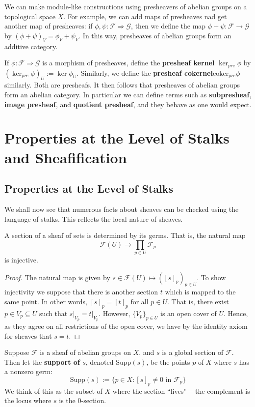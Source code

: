 We can make module-like constructions using presheavers of abelian groups on a topological space $X$. For example, we can add maps of presheaves nad get another map of presheaves: if $\phi,\psi:\mathscr{F}\Rightarrow \mathscr{G}$, then we define the map $\phi+\psi:\mathscr{F}\rightarrow \mathscr{G}$ by $(\phi+\psi)_V = \phi_V+\psi_V$. In this way, presheaves of abelian groups form an additive category.

If $\phi:\mathscr{F}\Rightarrow \mathscr{G}$ is a morphism of presheaves, define the \textbf{presheaf kernel} $\ker_{pre}\phi$ by $(\ker_{pre}\phi)_U := \ker \phi_U$. Similarly, we define the \textbf{presheaf cokernel}$ \text{coker}_{pre}\phi$ similarly. Both are presheafs. It then follows that presheaves of abelian groups form an abelian category. In particular we can define terms such as \textbf{subpresheaf}, \textbf{image presheaf}, and \textbf{quotient presheaf}, and they behave as one would expect.

\section{Properties at the Level of Stalks and Sheafification}

\subsection{Properties at the Level of Stalks}

We shall now see that numerous facts about sheaves can be checked using the language of stalks. This reflects the local nature of sheaves. 

\begin{claim}
    A section of a sheaf of sets is determined by its germs. That is, the natural map $$\mathscr{F}(U)\rightarrow \prod_{p \in U}\mathscr{F}_p$$ is injective.
\end{claim}
\begin{proof}
    The natural map is given by $s \in \mathscr{F}(U)\mapsto ([s]_p)_{p \in U}$. To show injectivity we suppose that there is another section $t$ which is mapped to the same point. In other words, $[s]_p = [t]_p$ for all $p \in U$. That is, there exist $p \in V_p \subseteq U$ such that $s\vert_{V_p} = t\vert_{V_p}$. However, $\{V_p\}_{p \in U}$ is an open cover of $U$. Hence, as they agree on all restrictions of the open cover, we have by the identity axiom for sheaves that $s = t$.
\end{proof}

\begin{definition}
    Suppose $\mathscr{F}$ is a sheaf of abelian groups on $X$, and $s$ is a global section of $\mathscr{F}$. Then let the \textbf{support of $s$}, denoted $\text{Supp}(s)$, be the points $p$ of $X$ where $s$ has a nonzero germ: $$\text{Supp}(s) := \{p \in X:[s]_p \neq 0\text{ in }\mathscr{F}_p\}$$
    We think of this as the subset of $X$ where the section ``lives"--- the complement is the locus where $s$ is the $0$-section.
\end{definition}

